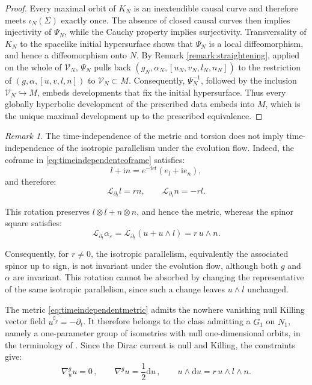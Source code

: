 \documentclass[10pt,reqno,a4paper]{amsart}
\theoremstyle{plain}
\theoremstyle{definition}
\theoremstyle{remark}
\newtheorem{remark}[thm]{Remark}
\theoremstyle{remark}
\def\dd{\mathrm{d}}
\renewcommand{\(}{ (}
\renewcommand{\)}{ )}
\begin{document}
\begin{proof}
\noindent
Every maximal orbit of $K_N$ is an inextendible causal curve and therefore meets $\iota_N(\Sigma)$ exactly once. The absence of closed causal curves then implies injectivity of $\Psi_N$, while the Cauchy property implies surjectivity. Transversality of $K_N$ to the spacelike initial hypersurface shows that $\Psi_N$ is a local diffeomorphism, and hence a diffeomorphism onto $N$. By Remark \ref{remark:straightening}, applied on the whole of $\mathcal V_N$, $\Psi_N$ pulls back $(g_N,\alpha_N,[u_N,v_N,l_N,n_N])$ to the restriction of $(g,\alpha,[u,v,l,n])$ to $\mathcal{V}_N\subset M$. Consequently, $\Psi_N^{-1}$, followed by the inclusion $\mathcal V_N\hookrightarrow M$, embeds developments that fix the initial hypersurface. Thus every globally hyperbolic development of the prescribed data embeds into $M$, which is the unique maximal development up to the prescribed equivalence.
\end{proof} 


\begin{remark} 
The time-independence of the metric and torsion does not imply time-independence of the isotropic parallelism under the evolution flow. Indeed, the coframe in \eqref{eq:timeindependentcoframe} satisfies:
\begin{equation*}
l+\mathrm{i}n=e^{-\mathrm{i}rt}(e_l+\mathrm{i}e_n),
\end{equation*}
and therefore:
\begin{equation*}
\mathcal{L}_{\partial_t}l=rn, \qquad \mathcal{L}_{\partial_t}n=-rl.
\end{equation*} 

\noindent
This rotation preserves $l\otimes l+n\otimes n$, and hence the metric, whereas the spinor square satisfies:
\begin{equation*}
\mathcal{L}_{\partial_t} \alpha_{\varepsilon} = \mathcal{L}_{\partial_t}(u+u\wedge l)=r\,u\wedge n.
\end{equation*}

\noindent
Consequently, for $r\neq0$, the isotropic parallelism, equivalently the associated spinor up to sign, is not invariant under the evolution flow, although both $g$ and $\alpha$ are invariant. This rotation cannot be absorbed by changing the representative of the same isotropic parallelism, since such a change leaves $u\wedge l$ unchanged. 
\end{remark}

\noindent
The metric \eqref{eq:timeindependentmetric} admits the nowhere vanishing null Killing vector field $u^{\sharp_g}=-\partial_t$. It therefore belongs to the class admitting a $G_1$ on $N_1$, namely a one-parameter group of isometries with null one-dimensional orbits, in the terminology of \cite[Section 24.4]{StephaniExactSolutions}. Since the Dirac current is null and Killing, the constraints give:
\begin{equation*}
\nabla^g_{u} u = 0\, , \qquad \nabla^g u=\frac{1}{2}\dd u\, , \qquad u\wedge\dd u=r\,u\wedge l\wedge n.
\end{equation*}
\end{document}
